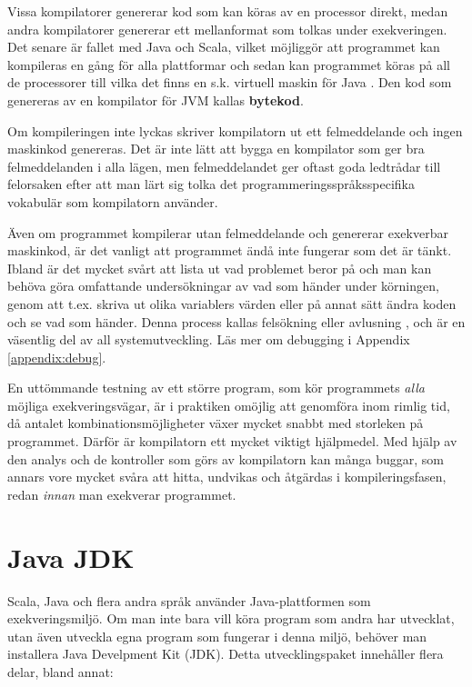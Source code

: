 Vissa kompilatorer genererar kod som kan köras av en processor direkt, medan andra kompilatorer genererar ett mellanformat som tolkas under exekveringen. Det senare är fallet med Java och Scala, vilket möjliggör att programmet kan kompileras en gång för alla plattformar och sedan kan programmet köras på all de processorer till vilka det finns en s.k. virtuell maskin för Java . Den kod som genereras av en kompilator för JVM kallas \textbf{bytekod}.

Om kompileringen inte lyckas skriver kompilatorn ut ett felmeddelande och ingen maskinkod genereras. Det är inte lätt att bygga en kompilator som ger bra felmeddelanden i alla lägen, men felmeddelandet ger oftast goda ledtrådar till felorsaken efter att man lärt sig tolka det programmeringsspråksspecifika vokabulär som kompilatorn använder.

Även om programmet kompilerar utan felmeddelande och genererar exekverbar maskinkod, är det vanligt att programmet ändå inte fungerar som det är tänkt. Ibland är det mycket svårt att lista ut vad problemet beror på och man kan behöva göra omfattande undersökningar av vad som händer under körningen, genom att t.ex. skriva ut olika variablers värden eller på annat sätt ändra koden och se vad som händer. Denna process kallas felsökning eller avlusning , och är en väsentlig del av all systemutveckling. Läs mer om debugging i Appendix \ref{appendix:debug}.

En uttömmande testning av ett större program, som kör programmets \textit{alla} möjliga exekveringsvägar, är i praktiken omöjlig att genomföra inom rimlig tid, då antalet kombinationsmöjligheter växer mycket snabbt med storleken på programmet.
Därför är kompilatorn ett mycket viktigt hjälpmedel. Med hjälp av den analys och de kontroller som görs av kompilatorn kan många buggar, som annars vore mycket svåra att hitta, undvikas och åtgärdas i kompileringsfasen, redan \textit{innan} man exekverar programmet.


\section{Java JDK}

Scala, Java och flera andra språk använder Java-plattformen som exekveringsmiljö. Om man inte bara vill köra program som andra har utvecklat, utan även utveckla egna program som fungerar i denna miljö, behöver man installera Java Develpment Kit (JDK). Detta utvecklingspaket innehåller flera delar, bland annat:

